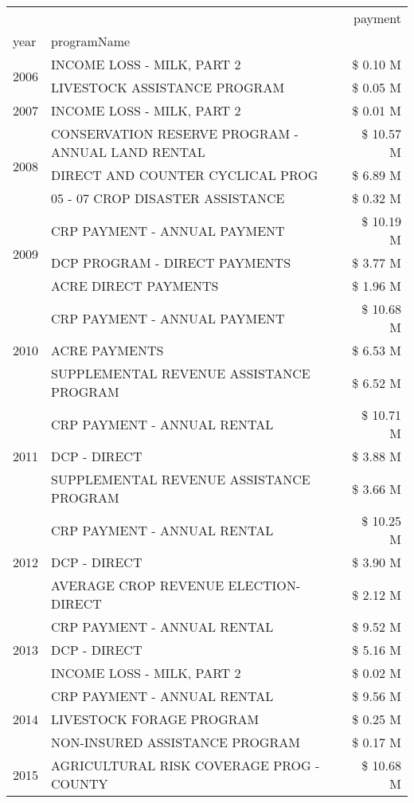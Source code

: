 \begin{tabular}{llr}
\toprule
 &  & payment \\
year & programName &  \\
\midrule
\multirow[t]{2}{*}{2006} & INCOME LOSS - MILK, PART 2 & \$ 0.10 M \\
 & LIVESTOCK ASSISTANCE PROGRAM & \$ 0.05 M \\
\cline{1-3}
2007 & INCOME LOSS - MILK, PART 2 & \$ 0.01 M \\
\cline{1-3}
\multirow[t]{3}{*}{2008} & CONSERVATION RESERVE PROGRAM - ANNUAL LAND RENTAL & \$ 10.57 M \\
 & DIRECT AND COUNTER CYCLICAL PROG & \$ 6.89 M \\
 & 05 - 07 CROP DISASTER ASSISTANCE & \$ 0.32 M \\
\cline{1-3}
\multirow[t]{3}{*}{2009} & CRP PAYMENT - ANNUAL PAYMENT & \$ 10.19 M \\
 & DCP PROGRAM - DIRECT PAYMENTS & \$ 3.77 M \\
 & ACRE DIRECT PAYMENTS & \$ 1.96 M \\
\cline{1-3}
\multirow[t]{3}{*}{2010} & CRP PAYMENT - ANNUAL PAYMENT & \$ 10.68 M \\
 & ACRE PAYMENTS & \$ 6.53 M \\
 & SUPPLEMENTAL REVENUE ASSISTANCE PROGRAM & \$ 6.52 M \\
\cline{1-3}
\multirow[t]{3}{*}{2011} & CRP PAYMENT - ANNUAL RENTAL & \$ 10.71 M \\
 & DCP - DIRECT & \$ 3.88 M \\
 & SUPPLEMENTAL REVENUE ASSISTANCE PROGRAM & \$ 3.66 M \\
\cline{1-3}
\multirow[t]{3}{*}{2012} & CRP PAYMENT - ANNUAL RENTAL & \$ 10.25 M \\
 & DCP - DIRECT & \$ 3.90 M \\
 & AVERAGE CROP REVENUE ELECTION-DIRECT & \$ 2.12 M \\
\cline{1-3}
\multirow[t]{3}{*}{2013} & CRP PAYMENT - ANNUAL RENTAL & \$ 9.52 M \\
 & DCP - DIRECT & \$ 5.16 M \\
 & INCOME LOSS - MILK, PART 2 & \$ 0.02 M \\
\cline{1-3}
\multirow[t]{3}{*}{2014} & CRP PAYMENT - ANNUAL RENTAL & \$ 9.56 M \\
 & LIVESTOCK FORAGE PROGRAM & \$ 0.25 M \\
 & NON-INSURED ASSISTANCE PROGRAM & \$ 0.17 M \\
\cline{1-3}
\multirow[t]{3}{*}{2015} & AGRICULTURAL RISK COVERAGE PROG - COUNTY & \$ 10.68 M \\

\end{tabular}
